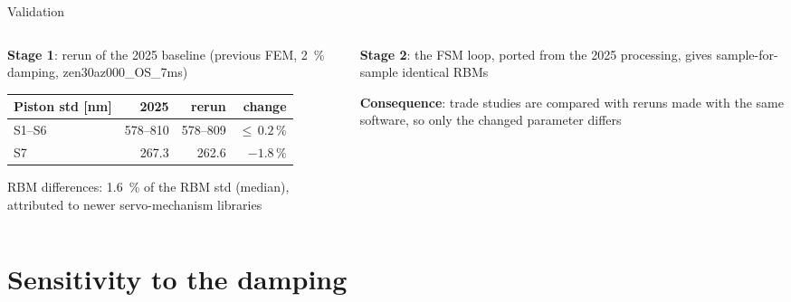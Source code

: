\documentclass[10pt,aspectratio=169]{beamer}
\begin{document}
\begin{frame}{Validation}
  \begin{columns}[T]
    \begin{column}{0.5\textwidth}
      \textbf{Stage 1}: rerun of the 2025 baseline (previous FEM, \SI{2}{\%} damping, zen30az000\_OS\_7ms)
      \vspace{1mm}

      \small
      \begin{tabular}{@{}lrrr@{}}
        \toprule
        Piston std [nm] & 2025 & rerun & change\\
        \midrule
        S1--S6 & 578--810 & 578--809 & ${\le}\,0.2\,\%$\\
        S7 & 267.3 & 262.6 & $-1.8\,\%$\\
        \bottomrule
      \end{tabular}

      \vspace{1mm}
      RBM differences: \SI{1.6}{\%} of the RBM std (median), attributed to newer servo-mechanism libraries
    \end{column}
    \begin{column}{0.46\textwidth}
      \textbf{Stage 2}: the FSM loop, ported from the 2025 processing, gives \alert{sample-for-sample identical} RBMs
      \vspace{3mm}

      \textbf{Consequence}: trade studies are compared with reruns made with the same software, so only the changed parameter differs
    \end{column}
  \end{columns}
\end{frame}

\section{Sensitivity to the damping}
\end{document}
